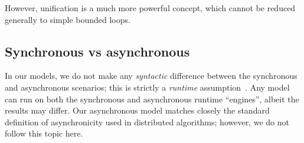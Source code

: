 However, unification is a much more powerful concept, 
which cannot be reduced generally to simple bounded loops.

\subsection{Synchronous vs asynchronous}
In our models, we do not make any \emph{syntactic} difference between the synchronous and asynchronous scenarios;
this is strictly a \emph{runtime} assumption~\cite{Nicolescu2012}.
Any model can run on both the synchronous and asynchronous runtime ``engines'',
albeit the results may differ.
Our asynchronous model matches closely the standard definition of asynchronicity used in distributed algorithms;
however, we do not follow this topic here.